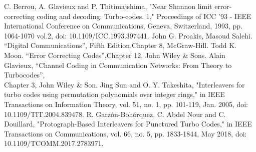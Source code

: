 \begin{thebibliography}{99}
  C. Berrou, A. Glavieux and P. Thitimajshima, "Near Shannon limit error-correcting coding and decoding: Turbo-codes. 1," Proceedings of ICC '93 - IEEE International Conference on Communications, Geneva, Switzerland, 1993, pp. 1064-1070 vol.2, doi: 10.1109/ICC.1993.397441.
 John G. Proakis, Masoud Salehi. ``Digital Communications'', 
Fifth Edition,Chapter 8, McGraw-Hill.
 Todd K. Moon. ``Error Correcting Codes'',Chapter 12, John Wiley \& Sons.
Alain Glavieux, ``Channel Coding in Communication Networks: From Theory to Turbocodes'',\\ Chapter 3, John Wiley \& Son. 
 Jing Sun and O. Y. Takeshita, "Interleavers for turbo codes using permutation polynomials over integer rings," in IEEE Transactions on Information Theory, vol. 51, no. 1, pp. 101-119, Jan. 2005, doi: 10.1109/TIT.2004.839478.
R. Garzón-Bohórquez, C. Abdel Nour and C. Douillard, "Protograph-Based Interleavers for Punctured Turbo Codes," in IEEE Transactions on Communications, vol. 66, no. 5, pp. 1833-1844, May 2018, doi: 10.1109/TCOMM.2017.2783971.
\end{thebibliography}